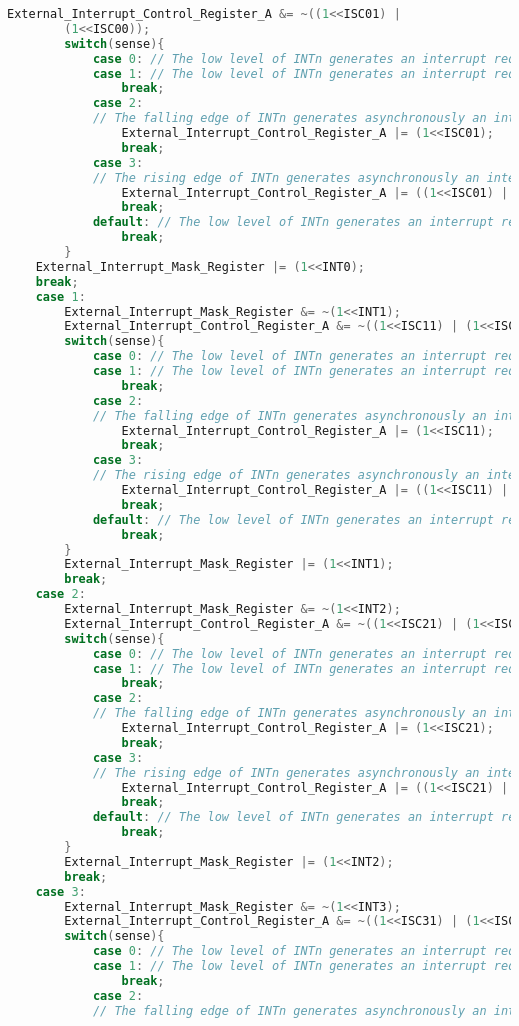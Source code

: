 \begin{lstlisting}[language=C, caption={atmega128interrupt.c}, label=atmega128interrupt-c, captionpos=b]
		External_Interrupt_Control_Register_A &= ~((1<<ISC01) |
		(1<<ISC00));
		switch(sense){
			case 0: // The low level of INTn generates an interrupt request.
			case 1: // The low level of INTn generates an interrupt request.
				break;
			case 2: 
			// The falling edge of INTn generates asynchronously an interrupt request.
				External_Interrupt_Control_Register_A |= (1<<ISC01);
				break;
			case 3: 
			// The rising edge of INTn generates asynchronously an interrupt request.
				External_Interrupt_Control_Register_A |= ((1<<ISC01) | (1<<ISC00));
				break;
			default: // The low level of INTn generates an interrupt request.
				break;
		}
	External_Interrupt_Mask_Register |= (1<<INT0);
	break;
	case 1:
		External_Interrupt_Mask_Register &= ~(1<<INT1);
		External_Interrupt_Control_Register_A &= ~((1<<ISC11) | (1<<ISC10));
		switch(sense){
			case 0: // The low level of INTn generates an interrupt request.
			case 1: // The low level of INTn generates an interrupt request.
				break;
			case 2: 
			// The falling edge of INTn generates asynchronously an interrupt request.
				External_Interrupt_Control_Register_A |= (1<<ISC11);
				break;
			case 3: 
			// The rising edge of INTn generates asynchronously an interrupt request.
				External_Interrupt_Control_Register_A |= ((1<<ISC11) | (1<<ISC10));
				break;
			default: // The low level of INTn generates an interrupt request.
				break;
		}
		External_Interrupt_Mask_Register |= (1<<INT1);
		break;
	case 2:
		External_Interrupt_Mask_Register &= ~(1<<INT2);
		External_Interrupt_Control_Register_A &= ~((1<<ISC21) | (1<<ISC20));
		switch(sense){
			case 0: // The low level of INTn generates an interrupt request.
			case 1: // The low level of INTn generates an interrupt request.
				break;
			case 2: 
			// The falling edge of INTn generates asynchronously an interrupt request.
				External_Interrupt_Control_Register_A |= (1<<ISC21);
				break;
			case 3: 
			// The rising edge of INTn generates asynchronously an interrupt request.
				External_Interrupt_Control_Register_A |= ((1<<ISC21) | (1<<ISC20));
				break;
			default: // The low level of INTn generates an interrupt request.
				break;
		}
		External_Interrupt_Mask_Register |= (1<<INT2);
		break;
	case 3:
		External_Interrupt_Mask_Register &= ~(1<<INT3);
		External_Interrupt_Control_Register_A &= ~((1<<ISC31) | (1<<ISC30));
		switch(sense){
			case 0: // The low level of INTn generates an interrupt request.
			case 1: // The low level of INTn generates an interrupt request.
				break;
			case 2: 
			// The falling edge of INTn generates asynchronously an interrupt request.

\end{lstlisting}
